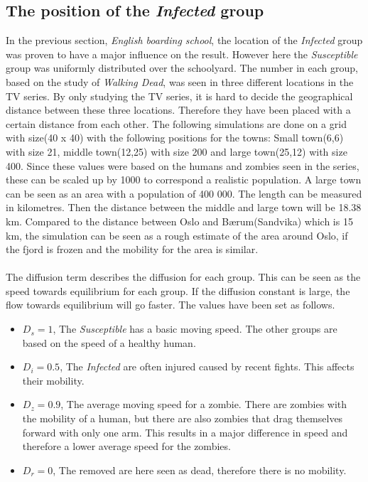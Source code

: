 \documentclass[%
twoside,                 %
final,                   %
chapterprefix=true,      %
open=right               %
10pt]{book}
\begin{document}


\subsection{The position of the \emph{Infected} group}
In the previous section, \emph{English boarding school}, the location of the \emph{Infected} group was proven to have a major influence on the result. However here the \emph{Susceptible} group was uniformly distributed over the schoolyard. The number in each group, based on the study of \emph{Walking Dead}, was seen in three different locations in the TV series. By only studying the TV series, it is hard to decide the geographical distance between these three locations. Therefore they have been placed with a certain distance from each other. The following simulations are done on a grid with size(40 x 40) with the following positions for the towns: Small town(6,6) with size 21, middle town(12,25) with size 200 and large town(25,12) with size 400. Since these values were based on the humans and zombies seen in the series, these can be scaled up by 1000 to correspond a realistic population. A large town can be seen as an area with a population of 400 000. The length can be measured in kilometres. Then the distance between the middle and large town will be 18.38 km. Compared to the distance between Oslo and Bærum(Sandvika) which is 15 km, the simulation can be seen as a rough estimate of the area around Oslo, if the fjord is frozen and the mobility for the area is similar.
\\
\\
The diffusion term describes the diffusion for each group. This can be seen as the speed towards equilibrium for each group. If the diffusion constant is large, the flow towards equilibrium will go faster. The values have been set as follows. 
\begin{itemize}
\item $D_s=1$, The \emph{Susceptible} has a basic moving speed. The other groups are based on the speed of a healthy human.

\item $D_i=0.5$, The \emph{Infected} are often injured caused by recent fights. This affects their mobility.

\item $D_z=0.9$, The average moving speed for a zombie. There are zombies with the mobility of a human, but there are also zombies that drag themselves forward with only one arm. This results in a major difference in speed and therefore a lower average speed for the zombies.

\item $D_r=0$, The removed are here seen as dead, therefore there is no mobility.
\end{itemize}
\end{document}
